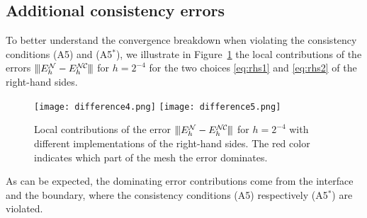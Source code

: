 \documentclass[12pt,reqno,a4paper]{amsart}
\theoremstyle{definition}
\def\NC{\mathcal{N\mkern-2mu C\mkern-2mu}}
\def\N{\mathcal{N}}
\newcommand{\tnorm}{{\vert\kern-0.25ex\vert\kern-0.25ex\vert}}
\begin{document}
\subsection*{Additional consistency errors}
To better understand the convergence breakdown when violating the consistency conditions (A5) and (A5$^*$), we illustrate in Figure~\ref{fig:err} the local contributions of the errors $\tnorm E_h^\N-E_h^\NC\tnorm$ for $h=2^{-4}$ for the two choices \eqref{eq:rhs1} and \eqref{eq:rhs2} of the right-hand sides.
\begin{figure}[ht!]
\texttt{[image: difference4.png]}\quad
\texttt{[image: difference5.png]}\quad
\captionsetup{width=.8\linewidth}
\caption{Local contributions of the error $\tnorm E_h^{\N}-E_h^\NC\tnorm $ for $h=2^{-4}$ with different implementations of the right-hand sides. The red color indicates which part of the mesh the error dominates. \label{fig:err}}
\end{figure}
As can be expected, the dominating error contributions come from the interface and the boundary, where the consistency conditions (A5) respectively (A5$^*$) are violated.
\end{document}
